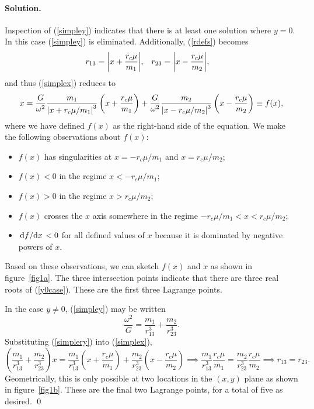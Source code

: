 \documentclass[11pt]{article}
\newcommand{\refeq}[1]{(\ref{#1})}
\newenvironment{solution}
{
    \paragraph{Solution.}
    \ignorespaces
}
{
    \bigskip
}
\begin{document}
\begin{solution}
	Inspection of \refeq{simpley} indicates that there is at least one solution where $y = 0$.  In this case \refeq{simpley} is eliminated.  Additionally, \refeq{rdefs} becomes
	\begin{align}
		r_{13} &= \qty|x + \frac{r_c \mu}{m_1}|, &
		r_{23} &= \qty|x - \frac{r_c \mu}{m_2}|,
	\end{align}
	and thus \refeq{simplex} reduces to
	\begin{equation}
		x = \frac{G}{\omega^2} \frac{m_1}{\qty|x + r_c \mu / m_1|^3} \left( x + \frac{r_c \mu}{m_1} \right) + \frac{G}{\omega^2} \frac{m_2}{\qty|x - r_c \mu / m_2|^3} \left( x - \frac{r_c \mu}{m_2} \right) \equiv f(x), \label{y0case}
	\end{equation}
	where we have defined $f(x)$ as the right-hand side of the equation.  We make the following observations about $f(x)$:
	\begin{itemize}
		\item $f(x)$ has singularities at $x = - r_c \mu / m_1$ and $x = r_c \mu / m_2$;
		\item $f(x) < 0$ in the regime $x < - r_c \mu / m_1$;
		\item $f(x) > 0$ in the regime $x > r_c \mu / m_2$;
		\item $f(x)$ crosses the $x$ axis somewhere in the regime $- r_c \mu / m_1 < x < r_c \mu / m_2$;
		\item $\dv*{f}{x} < 0$ for all defined values of $x$ because it is dominated by negative powers of $x$.
	\end{itemize}
	Based on these observations, we can sketch $f(x)$ and $x$ as shown in figure~\ref{fig1a}.  The three intersection points indicate that there are three real roots of \refeq{y0case}.  These are the first three Lagrange points.
	
	In the case $y \neq 0$, \refeq{simpley} may be written
	\begin{equation} \label{simplery}
		\frac{\omega^2}{G} = \frac{m_1}{r_{13}^3} + \frac{m_2}{r_{23}^3}.
	\end{equation}
	Substituting \refeq{simplery} into \refeq{simplex},
	\begin{equation}
		\left (\frac{m_1}{r_{13}^3} + \frac{m_2}{r_{23}^3} \right) x = \frac{m_1}{r_{13}^3} \left( x + \frac{r_c \mu}{m_1} \right) + \frac{m_2}{r_{23}^3} \left( x - \frac{r_c \mu}{m_2} \right) \implies \frac{m_1}{r_{13}^3} \frac{r_c \mu}{m_1} = \frac{m_2}{r_{23}^3} \frac{r_c \mu}{m_2} \implies r_{13} = r_{23}. \label{yn0case}
	\end{equation}
	Geometrically, this is only possible at two locations in the $(x, y)$ plane as shown in figure~\ref{fig1b}.  These are the final two Lagrange points, for a total of five as desired. \qed
\end{solution}
	
\end{document}
